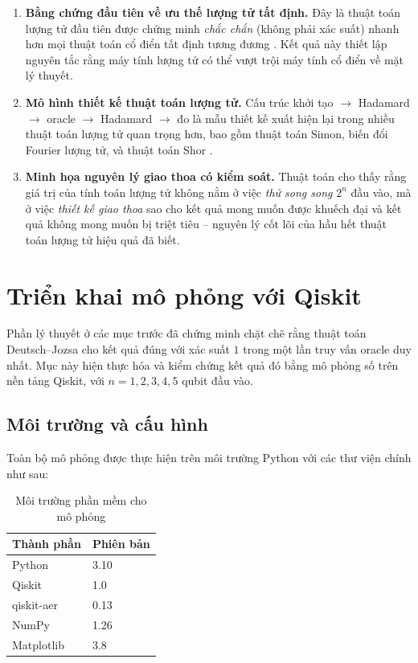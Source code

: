 \begin{enumerate}
    \item \textbf{Bằng chứng đầu tiên về ưu thế lượng tử tất định.} Đây là
          thuật toán lượng tử đầu tiên được chứng minh \emph{chắc chắn} (không
          phải xác suất) nhanh hơn mọi thuật toán cổ điển tất định tương đương
          \cite{ref3}. Kết quả này thiết lập nguyên tắc rằng máy tính lượng tử
          có thể vượt trội máy tính cổ điển về mặt lý thuyết.
    \item \textbf{Mô hình thiết kế thuật toán lượng tử.} Cấu trúc
          khởi tạo $\to$ Hadamard $\to$ oracle $\to$ Hadamard $\to$ đo là mẫu
          thiết kế xuất hiện lại trong nhiều thuật toán lượng tử quan trọng hơn,
          bao gồm thuật toán Simon, biến đổi Fourier lượng tử, và thuật toán
          Shor \cite{ref5}.
    \item \textbf{Minh họa nguyên lý giao thoa có kiểm soát.} Thuật toán cho
          thấy rằng giá trị của tính toán lượng tử không nằm ở việc \emph{thử
          song song} $2^n$ đầu vào, mà ở việc \emph{thiết kế giao thoa} sao
          cho kết quả mong muốn được khuếch đại và kết quả không mong muốn bị
          triệt tiêu -- nguyên lý cốt lõi của hầu hết thuật toán lượng tử hiệu
          quả đã biết.
\end{enumerate}

\section{Triển khai mô phỏng với Qiskit}
\label{sec:qiskit}

Phần lý thuyết ở các mục trước đã chứng minh chặt chẽ rằng thuật toán
Deutsch--Jozsa cho kết quả đúng với xác suất $1$ trong một lần truy vấn
oracle duy nhất. Mục này hiện thực hóa
và kiểm chứng kết quả đó bằng mô phỏng số trên nền tảng Qiskit, với
$n = 1, 2, 3, 4, 5$ qubit đầu vào.

\subsection*{Môi trường và cấu hình}

Toàn bộ mô phỏng được thực hiện trên môi trường Python với các thư viện
chính như sau:

\begin{table}[htbp]
\centering
\caption{Môi trường phần mềm cho mô phỏng}
\label{tab:env}
\begin{tabular}{ll}
\hline
\textbf{Thành phần} & \textbf{Phiên bản} \\
\hline
Python        & 3.10 \\
Qiskit        & 1.0  \\
qiskit-aer    & 0.13 \\
NumPy         & 1.26 \\
Matplotlib    & 3.8  \\
\hline
\end{tabular}

\end{table}


